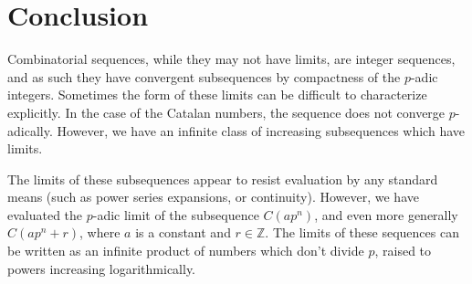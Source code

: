 \documentclass[12pt, letter]{article}    %
\theoremstyle{plain}
\newtheorem{proposition}[theorem]{Proposition}
\theoremstyle{definition}
\numberwithin{equation}{section}
\newcommand{\Lim}[1]{\raisebox{0.5ex}{\scalebox{0.8}{$\displaystyle \lim_{#1}\;$}}}
\newcommand{\integers}{\mathbb{Z}}
\newcommand{\thref}[1]{Theorem \ref{#1}}
\newcommand{\thlabel}[1]{\label{#1}}
\begin{document}




\section{Conclusion}

Combinatorial sequences, while they may not have limits, are integer sequences, and as such they have convergent subsequences by compactness of the $p$-adic integers. Sometimes the form of these limits can be difficult to characterize explicitly. In the case of the Catalan numbers, the sequence does not converge $p$-adically. However, we have an infinite class of increasing subsequences which have limits. 

The limits of these subsequences appear to resist evaluation by any standard means (such as power series expansions, or continuity). However, we have evaluated the $p$-adic limit of the subsequence $C(ap^n)$, and even more generally $C(ap^n+r)$, where $a$ is a constant and $r\in\integers$. The limits of these sequences can be written as an infinite product of numbers which don't divide $p$, raised to powers increasing logarithmically.
\end{document}
